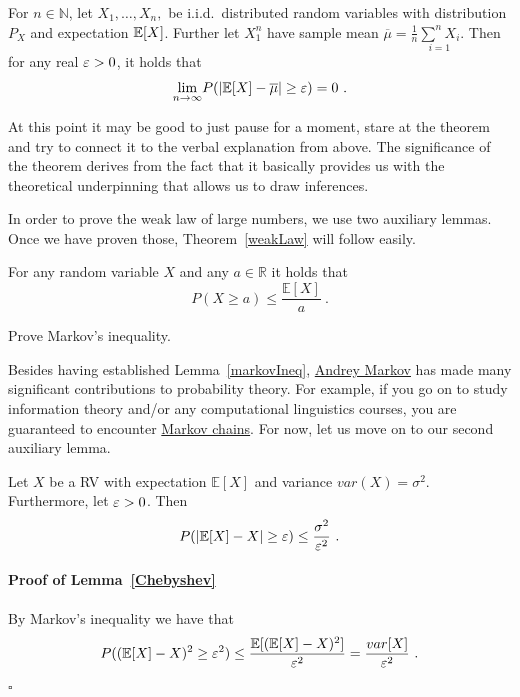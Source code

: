 \begin{Theorem}\label{weakLaw}
For $n \in \mathbb{N}$, let $ X_{1}, \ldots, X_{n},$ be  i.i.d.\ distributed random variables with distribution $ P_{X} $ and expectation $ \mathbb{E}[X] $. Further let
$ X_{1}^{n} $ have sample mean $ \overline{\mu} = \frac{1}{n} \underset{i=1}{\overset{n}{\sum}X_{i}} $. Then for any real $ \varepsilon > 0 $, it holds that 
$$ \underset{n \rightarrow \infty}{\lim}P(|\mathbb{E}[X] - \overline{\mu}| \geq \eps) = 0 \ . $$
\end{Theorem}

At this point it may be good to just pause for a moment, stare at the theorem and try to connect it to the verbal explanation from above. The significance of the theorem
derives from the fact that it basically provides us with the theoretical underpinning that allows us to draw inferences.

In order to prove the weak law of large numbers, we use two auxiliary lemmas. Once we have proven those, Theorem~\ref{weakLaw} will follow easily. 

\begin{Lemma}\label{markovIneq}
For any random variable $ X $ and any $ a \in \mathbb{R} $ it holds that
$$ P(X \geq a) \leq \dfrac{\mathbb{E}[X]}{a} \ . $$
\end{Lemma}

\begin{Exercise}
Prove Markov's inequality.
\end{Exercise}

Besides having established Lemma~\ref{markovIneq}, \href{https://en.wikipedia.org/wiki/Andrey_Markov}{Andrey Markov} has made many significant contributions to
probability theory. For example, if you go on to study information theory and/or any computational linguistics courses, you are guaranteed to encounter \href{https://en.wikipedia.org/wiki/Markov_chain}{Markov chains}. For now, let us move on to our second auxiliary lemma.

\begin{Lemma}\label{Chebyshev}
Let $ X $ be a RV with expectation $ \mathbb{E}[X] $ and variance $ var(X) = \sigma^{2} $. Furthermore, let $ \varepsilon > 0 $. Then
$$ P( \left|\mathbb{E}[X] - X \right| \geq \varepsilon) \leq \dfrac{\sigma^{2}}{\varepsilon^{2}} \ . $$ 
\end{Lemma}

\paragraph{Proof of Lemma~\ref{Chebyshev}} 
By Markov's inequality we have that
\begin{equation}
P((\mathbb{E}[X] - X)^{2} \geq \varepsilon^{2}) \leq \frac{\mathbb{E}[(\mathbb{E}[X]-X)^2]}{\varepsilon^2} = \dfrac{var[X]}{\varepsilon^{2}} \ .
\end{equation}  
\hfill $ \square $ \bigskip

